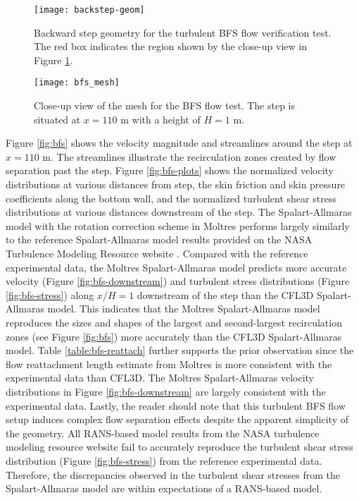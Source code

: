 \begin{figure}[p]
  \centering
  \texttt{[image: backstep-geom]}
  \caption{Backward step geometry for the turbulent \gls{BFS} flow verification test. The red box indicates
  the region shown by the close-up view in Figure \ref{fig:bfs-mesh}.}
  \label{fig:backstep-geom}
  \centering
  \texttt{[image: bfs\_mesh]}
  \caption{Close-up view of the mesh for the \gls{BFS} flow test. The step is situated at $x=110$ m
  with a height of $H=1$ m.}
  \label{fig:bfs-mesh}
\end{figure}

Figure \ref{fig:bfs} shows the velocity magnitude and streamlines around the step at $x=110$ m. The
streamlines illustrate the recirculation zones created by flow separation past the step.
Figure \ref{fig:bfs-plots} shows the normalized velocity distributions at various distances from
step, the skin friction and skin pressure coefficients along the bottom wall, and the normalized
turbulent shear stress distributions at various distances downstream of the step. The Spalart-Allmaras
model with the rotation correction scheme in Moltres performs largely similarly to the reference
Spalart-Allmaras model results provided on the \gls{NASA} Turbulence Modeling Resource website
\cite{rumsey_turbulence_nodate}. Compared with the reference experimental data, the Moltres
Spalart-Allmaras model predicts more accurate velocity (Figure \ref{fig:bfs-downstream}) and turbulent
stress distributions (Figure \ref{fig:bfs-stress}) along $x/H=1$ downstream of the
step than the CFL3D Spalart-Allmaras model. This indicates that the Moltres
Spalart-Allmaras model reproduces the sizes and shapes of the largest and second-largest recirculation
zones (see Figure \ref{fig:bfs}) more accurately than the CFL3D Spalart-Allmaras model. Table
\ref{table:bfs-reattach} further supports the prior observation since the flow reattachment length
estimate from Moltres is more consistent with the experimental data than CFL3D. The Moltres
Spalart-Allmaras velocity distributions in Figure \ref{fig:bfs-downstream} are largely consistent with the
experimental data. Lastly, the reader should
note that this turbulent \gls{BFS} flow setup induces complex flow separation effects despite the
apparent simplicity of the geometry. All \gls{RANS}-based model results from the \gls{NASA}
turbulence modeling resource website \cite{rumsey_turbulence_nodate} fail to accurately reproduce
the turbulent shear stress distribution (Figure \ref{fig:bfs-stress}) from the reference
experimental data. Therefore, the discrepancies observed in the turbulent shear stresses from the
Spalart-Allmaras model are within expectations of a \gls{RANS}-based model.

